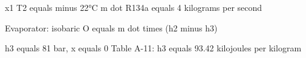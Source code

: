 x1  
T2 equals minus 22°C  
m dot R134a equals 4 kilograms per second  

Evaporator: isobaric  
O equals m dot times (h2 minus h3)  

h3 equals 81 bar, x equals 0  
Table A-11: h3 equals 93.42 kilojoules per kilogram
